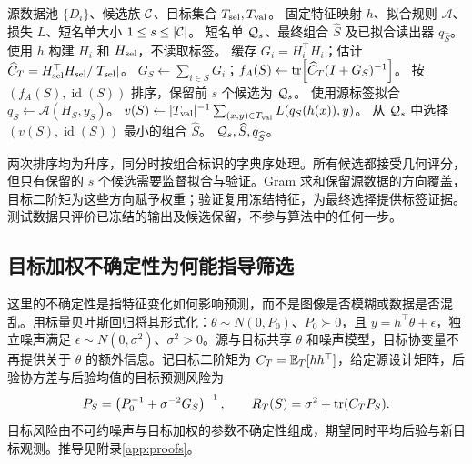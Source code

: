 \newpage
\begin{algorithm}[H]
\caption{Target A-opt 预筛选与验证}
\label{alg:target-a}
\begin{algorithmic}[1]
\Require 源数据池 $\{D_i\}$、候选族 $\mathcal{C}$、目标集合 $T_{\rm sel},T_{\rm val}$。
\Require 固定特征映射 $h$、拟合规则 $\mathcal A$、损失 $L$、短名单大小 $1\leq s\leq|\mathcal{C}|$。
\Ensure 短名单 $\mathcal{Q}_s$、最终组合 $\widehat S$ 及已拟合读出器 $q_{\widehat S}$。
\State 使用 $h$ 构建 $H_i$ 和 $H_{\rm sel}$，不读取标签。
\State 缓存 $G_i=H_i^\top H_i$；估计 $\widehat C_T=H_{\rm sel}^\top H_{\rm sel}/|T_{\rm sel}|$。
  \State $G_S\gets\sum_{i\in S}G_i$；$f_A(S)\gets\operatorname{tr}\!\left[\widehat C_T(I+G_S)^{-1}\right]$。
\EndFor
\State 按 $(f_A(S),\operatorname{id}(S))$ 排序，保留前 $s$ 个候选为 $\mathcal{Q}_s$。
  \State 使用源标签拟合 $q_S\gets\mathcal A(H_S,y_S)$。
  \State $v(S)\gets |T_{\rm val}|^{-1}\sum_{(x,y)\in T_{\rm val}}L(q_S(h(x)),y)$。
\EndFor
\State 从 $\mathcal{Q}_s$ 中选择 $(v(S),\operatorname{id}(S))$ 最小的组合 $\widehat S$。
\State \Return $\mathcal{Q}_s,\widehat S,q_{\widehat S}$。
\end{algorithmic}
\end{algorithm}

两次排序均为升序，同分时按组合标识的字典序处理。所有候选都接受几何评分，但只有保留的 $s$ 个候选需要监督拟合与验证。Gram 求和保留源数据的方向覆盖，目标二阶矩为这些方向赋予权重；验证复用冻结特征，为最终选择提供标签证据。测试数据只评价已冻结的输出及候选保留，不参与算法中的任何一步。

\subsection{目标加权不确定性为何能指导筛选}
这里的不确定性是指特征变化如何影响预测，而不是图像是否模糊或数据是否混乱。用标量贝叶斯回归将其形式化：$\theta\sim N(0,P_0)$、$P_0\succ0$，且 $y=h^\top\theta+\epsilon$，独立噪声满足 $\epsilon\sim N(0,\sigma^2)$、$\sigma^2>0$。源与目标共享 $\theta$ 和噪声模型，目标协变量不再提供关于 $\theta$ 的额外信息。记目标二阶矩为 $C_T=\mathbb{E}_T[hh^\top]$，给定源设计矩阵，后验协方差与后验均值的目标预测风险为
\begin{equation}
 P_S=\left(P_0^{-1}+\sigma^{-2}G_S\right)^{-1},\qquad
 R_T(S)=\sigma^2+\operatorname{tr}(C_TP_S).
 \label{eq:risk}
\end{equation}
目标风险由不可约噪声与目标加权的参数不确定性组成，期望同时平均后验与新目标观测。推导见附录\ref{app:proofs}。

